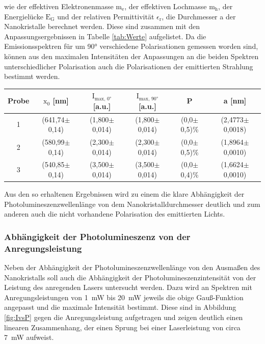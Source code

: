         wie der effektiven Elektronenmasse $\text{m}_{\text{e}}$, der effektiven Lochmasse $\text{m}_{\text{h}}$, der Energielücke $\text{E}_{\text{G}}$ und der relativen Permittivität $\epsilon_{\text{r}}$,
        die Durchmesser a der Nanokristalle berechnet werden. Diese sind zusammen mit den Anpassungsergebnissen in Tabelle \ref{tab:Werte} aufgelistet. Da die Emissionsspektren für um 90° verschiedene 
        Polarisationen gemessen worden sind, können aus den maximalen Intensitäten der Anpassungen an die beiden Spektren unterschiedlicher Polarisation auch die Polarisationen der emittierten Strahlung 
        bestimmt werden.


        \begin{center}
            \label{tab:Werte}
            \begin{tabular}{c c c c c c}
                \toprule
                Probe & $\text{x}_0 $ [nm] & $\text{I}_{\text{max, 0°}}$ [a.u.] & $\text{I}_{\text{max, 90°}}$ [a.u.] & P & a [nm] \\
                \midrule
                1  & (641,74$\pm$0,14) & (1,800$\pm$0,014) & (1,800$\pm$0,014) & (0,0$\pm$0,5)\% & (2,4773$\pm$0,0018) \\
                2  & (580,99$\pm$0,14) & (2,300$\pm$0,014) & (2,300$\pm$0,014) & (0,0$\pm$0,5)\% & (1,8964$\pm$0,0010) \\
                3  & (540,85$\pm$0,14) & (3,500$\pm$0,014) & (3,500$\pm$0,014) & (0,0$\pm$0,4)\% & (1,6624$\pm$0,0010) \\

                \bottomrule
            \end{tabular}
        \end{center}

        Aus den so erhaltenen Ergebnissen wird zu einem die klare Abhängigkeit der Photolumineszenzwellenlänge von dem Nanokristalldurchmesser deutlich und zum anderen auch die nicht vorhandene Polarisation 
        des emittierten Lichts. 

    \newpage
    \subsubsection*{Abhängigkeit der Photolumineszenz von der Anregungsleistung}
        Neben der Abhängigkeit der Photolumineszenzwellenlänge von den Ausmaßen des Nanokristalls soll auch die Abhängigkeit der Photolumineszenzintensität von der Leistung des anregenden Lasers untersucht werden. 
        Dazu wird an Spektren mit Anregungsleistungen von \SI{1}{\milli\watt} bis \SI{20}{\milli\watt} jeweils die obige Gauß-Funktion angepasst und die maximale Intensität bestimmt. Diese sind in Abbildung 
        \ref{fig:IvsP} gegen die Anregungsleistung aufgetragen und zeigen deutlich einen linearen Zusammenhang, der einen Sprung bei einer Laserleistung von circa \SI{7}{\milli\watt} aufweist. 


